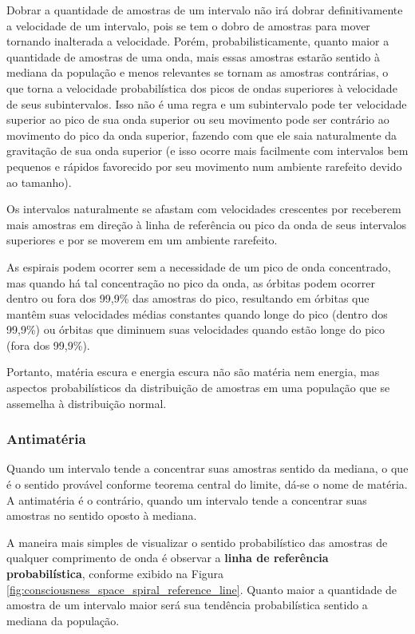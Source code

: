 Dobrar a quantidade de amostras de um intervalo não irá dobrar definitivamente a velocidade de um intervalo, pois se tem o dobro de amostras para mover tornando inalterada a velocidade. Porém, probabilisticamente, quanto maior a quantidade de amostras de uma onda, mais essas amostras estarão sentido à mediana da população e menos relevantes se tornam as amostras contrárias, o que torna a velocidade probabilística dos picos de ondas superiores à velocidade de seus subintervalos. Isso não é uma regra e um subintervalo pode ter velocidade superior ao pico de sua onda superior ou seu movimento pode ser contrário ao movimento do pico da onda superior, fazendo com que ele saia naturalmente da gravitação de sua onda superior (e isso ocorre mais facilmente com intervalos bem pequenos e rápidos favorecido por seu movimento num ambiente rarefeito devido ao tamanho). 

Os intervalos naturalmente se afastam com velocidades crescentes por receberem mais amostras em direção à linha de referência ou pico da onda de seus intervalos superiores e por se moverem em um ambiente rarefeito.

As espirais podem ocorrer sem a necessidade de um pico de onda concentrado, mas quando há tal concentração no pico da onda, as órbitas podem ocorrer dentro ou fora dos 99,9\% das amostras do pico, resultando em órbitas que mantêm suas velocidades médias constantes quando longe do pico (dentro dos 99,9\%) ou órbitas que diminuem suas velocidades quando estão longe do pico (fora dos 99,9\%).

Portanto, matéria escura e energia escura não são matéria nem energia, mas aspectos probabilísticos da distribuição de amostras em uma população que se assemelha à distribuição normal.

\subsubsection{Antimatéria}
Quando um intervalo tende a concentrar suas amostras sentido da mediana, o que é o sentido provável conforme teorema central do limite, dá-se o nome de matéria. A antimatéria é o contrário, quando um intervalo tende a concentrar suas amostras no sentido oposto à mediana. 

A maneira mais simples de visualizar o sentido probabilístico das amostras de qualquer comprimento de onda é observar a \textbf{linha de referência probabilística}, conforme exibido na Figura \ref{fig:consciousness_space_spiral_reference_line}. Quanto maior a quantidade de amostra de um intervalo maior será sua tendência probabilística sentido a mediana da população.

